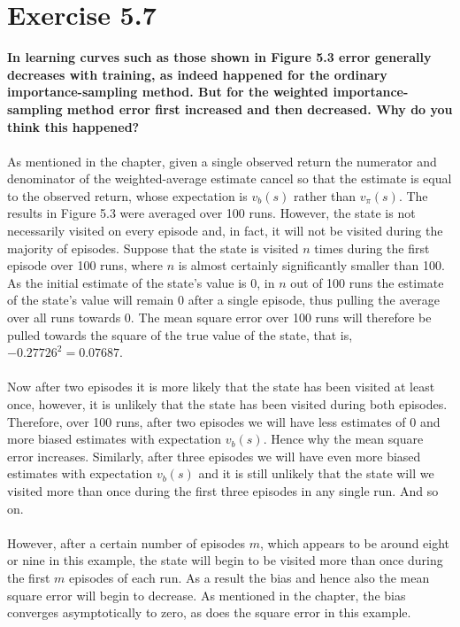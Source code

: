 \documentclass[a4paper,11pt]{article}
\numberwithin{equation}{section}
\theoremstyle{remark}
\begin{document}
\section{Exercise 5.7}

\textbf{In learning curves such as those shown in Figure 5.3 error generally decreases with training, as indeed happened for the ordinary importance-sampling method. But for the weighted importance-sampling method error first increased and then decreased. Why do you think this happened?}
\\ \\
As mentioned in the chapter, given a single observed return the numerator and denominator of the weighted-average estimate cancel so that the estimate is equal to the observed return, whose expectation is $v_b(s)$ rather than $v_\pi(s)$. The results in Figure 5.3 were averaged over 100 runs. However, the state is not necessarily visited on every episode and, in fact, it will not be visited during the majority of episodes. Suppose that the state is visited $n$ times during the first episode over 100 runs, where $n$ is almost certainly significantly smaller than 100. As the initial estimate of the state's value is 0, in $n$ out of 100 runs the estimate of the state's value will remain 0 after a single episode, thus pulling the average over all runs towards 0. The mean square error over 100 runs will therefore be pulled towards the square of the true value of the state, that is, $-0.27726^2 = 0.07687$.
\\ \\
Now after two episodes it is more likely that the state has been visited at least once, however, it is unlikely that the state has been visited during both episodes. Therefore, over 100 runs, after two episodes we will have less estimates of 0 and more biased estimates with expectation $v_b(s)$. Hence why the mean square error increases. Similarly, after three episodes we will have even more biased estimates with expectation $v_b(s)$ and it is still unlikely that the state will we visited more than once during the first three episodes in any single run. And so on. 
\\ \\
However, after a certain number of episodes $m$, which appears to be around eight or nine in this example, the state will begin to be visited more than once during the first $m$ episodes of each run. As a result the bias and hence also the mean square error will begin to decrease. As mentioned in the chapter, the bias converges asymptotically to zero, as does the square error in this example. 
\end{document}
